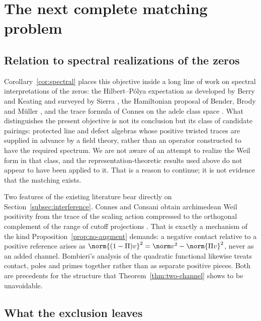 \section{The next complete matching problem}\label{sec:outlook}
\subsection{Relation to spectral realizations of the zeros}
Corollary~\ref{cor:spectral} places this objective inside a long line of work
on spectral interpretations of the zeros: the Hilbert--P\'olya expectation as
developed by Berry and Keating \cite{BerryKeating} and surveyed by Sierra
\cite{Sierra}, the Hamiltonian proposal of Bender, Brody and M\"uller
\cite{BBM}, and the trace formula of Connes on the adele class space
\cite{ConnesTrace,CCM}. What distinguishes the present objective is not its
conclusion but its class of candidate pairings: protected line and defect
algebras whose positive twisted traces are supplied in advance by a field
theory, rather than an operator constructed to have the required spectrum.
We are not aware of an attempt to realize the Weil form in that class, and
the representation-theoretic results used above
\cite{Sphere,Schur,RG,EKRS,Klyuev} do not appear to have been applied to it.
That is a reason to continue; it is not evidence that the matching exists.

Two features of the existing literature bear directly on
Section~\ref{subsec:interference}. Connes and Consani obtain archimedean Weil
positivity from the trace of the scaling action compressed to the orthogonal
complement of the range of cutoff projections \cite{CCWeil}. That is exactly
a mechanism of the kind Proposition~\ref{prop:no-augment} demands: a negative
contact relative to a positive reference arises as
$\norm{(1-\Pi)v}^2=\norm v^2-\norm{\Pi v}^2$, never as an added channel.
Bombieri's analysis of the quadratic functional \cite{Bombieri} likewise
treats contact, poles and primes together rather than as separate positive
pieces. Both are precedents for the structure that
Theorem~\ref{thm:two-channel} shows to be unavoidable.

\subsection{What the exclusion leaves}\label{subsec:leaves}
